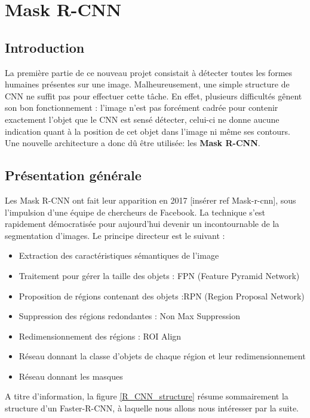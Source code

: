 

\chapter{Mask R-CNN}


\section{Introduction}

La première partie de ce nouveau projet consistait à détecter toutes les formes humaines présentes sur une image. Malheureusement, une simple structure de CNN ne suffit pas pour effectuer cette tâche. En effet, plusieurs difficultés gênent son bon fonctionnement : l'image n'est pas forcément cadrée pour contenir exactement l'objet que le CNN est sensé détecter, celui-ci ne donne aucune indication quant à la position de cet objet dans l'image ni même ses contours. Une nouvelle architecture a donc dû être utilisée: les \textbf{Mask R-CNN}.

\section{Présentation générale}

Les Mask R-CNN ont fait leur apparition en 2017 [insérer ref Mask-r-cnn], sous l'impulsion d'une équipe de chercheurs de Facebook. La technique s'est rapidement démocratisée pour aujourd'hui devenir un incontournable de la segmentation d'images. Le principe directeur est le suivant :
 \begin{itemize}
\item Extraction des caractéristiques sémantiques de l'image
\item Traitement pour gérer la taille des objets : FPN (Feature Pyramid Network)
\item Proposition de régions contenant des objets :RPN (Region Proposal Network)
\item Suppression des régions redondantes : Non Max Suppression
\item Redimensionnement des régions : ROI Align
\item Réseau donnant la classe d'objets de chaque région et leur redimensionnement
\item Réseau donnant les masques
\end{itemize}

A titre d'information, la figure \ref{R_CNN_structure} résume sommairement la structure d'un Faster-R-CNN, à laquelle nous allons nous intéresser par la suite.

